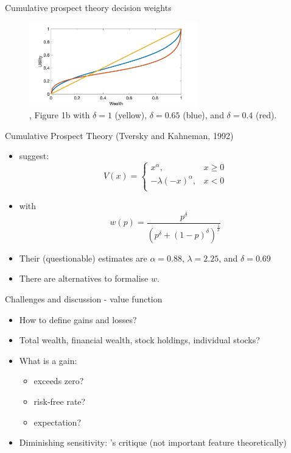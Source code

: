 \documentclass[11pt, aspectratio=169]{beamer}
\begin{document}
\begin{frame}{Cumulative prospect theory decision weights}
    \begin{figure}
\centering
\includegraphics[width= 0.65\textwidth]{cpt_weights}
\caption{\citet{Barberis2012a}, Figure 1b with $\delta = 1$ (yellow), $\delta =0.65$ (blue), and $\delta =0.4$ (red).}
    \end{figure}
\end{frame}

\begin{frame}{Cumulative Prospect Theory (Tversky and Kahneman, 1992)}
    \begin{itemize}
        \item \citet{TverskyKahneman1992} suggest:
\begin{equation}
    V(x) = \begin{cases}
    x^\alpha,  & x\geq 0\\
    -\lambda (-x)^\alpha,  & x< 0\\
    \end{cases}
\end{equation}\medskip
\item with \[w(p) = \frac{p^{\delta}}{(p^{\delta}+(1-p)^{\delta})^{\frac{1}{\delta}}}\]
\item Their (questionable) estimates are $\alpha =0.88$, $\lambda =2.25$, and  $\delta =0.69$\medskip
    \item There are alternatives to formalise $w$.
\end{itemize}
\end{frame}

\begin{frame}{Challenges and discussion - value function}
    \begin{itemize}
        \item How to define gains and losses?\bigskip
        \item Total wealth, financial wealth, stock holdings, individual stocks?\bigskip
        \item What is a gain:\medskip
        \begin{itemize}
            \item exceeds zero?\medskip
            \item risk-free rate?\medskip
            \item expectation?\medskip
        \end{itemize}
                \item Diminishing sensitivity: \citet{Rabin2000}'s critique (not important feature theoretically)\medskip
        \end{itemize}
        \end{frame}
\end{document}
